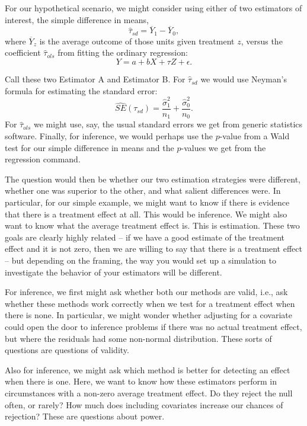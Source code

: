\documentclass[
]{book}
\begin{document}
For our hypothetical scenario, we might consider using either of two estimators of interest, the simple difference in means,
\[ \hat{\tau}_{sd} = \overline{Y}_1 - \overline{Y}_0,  \]
where \(\overline{Y}_z\) is the average outcome of those units given treatment \(z\), versus the coefficient \(\widehat{\tau}_{ols}\) from fitting the ordinary regression:
\[ Y = a + b X + \tau Z + \epsilon .\]

Call these two Estimator A and Estimator B.
For \(\hat{\tau}_{sd}\) we would use Neyman's formula for estimating the standard error:
\[ \widehat{SE}(\tau_{sd} ) = \frac{ \hat{\sigma}_1^2 }{ n_1 } + \frac{ \hat{\sigma}_0^2}{n_0} . \]
For \(\widehat{\tau}_{ols}\) we might use, say, the usual standard errors we get from generic statistics software.
Finally, for inference, we would perhaps use the \(p\)-value from a Wald test for our simple difference in means and the \(p\)-values we get from the regression command.

The question would then be whether our two estimation strategies were different, whether one was superior to the other, and what salient differences were.
In particular, for our simple example, we might want to know if there is evidence that there is a treatment effect at all.
This would be inference.
We might also want to know what the average treatment effect is. This is estimation.
These two goals are clearly highly related -- if we have a good estimate of the treatment effect and it is not zero, then we are willing to say that there is a treatment effect -- but depending on the framing, the way you would set up a simulation to investigate the behavior of your estimators will be different.

For inference, we first might ask whether both our methods are valid, i.e., ask whether these methods work correctly when we test for a treatment effect when there is none.
In particular, we might wonder whether adjusting for a covariate could open the door to inference problems if there was no actual treatment effect, but where the residuals had some non-normal distribution.
These sorts of questions are questions of validity.

Also for inference, we might ask which method is better for detecting an effect when there is one.
Here, we want to know how these estimators perform in circumstances with a non-zero average treatment effect.
Do they reject the null often, or rarely?
How much does including covariates increase our chances of rejection?
These are questions about power.
\end{document}
